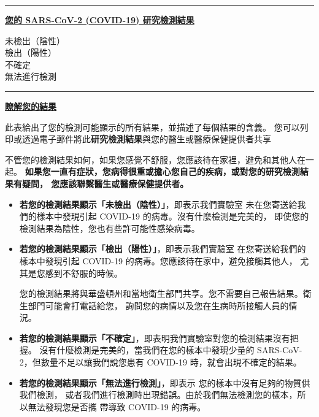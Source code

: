 \documentclass[10pt]{article}
\newcommand{\PageLine}{\rule{\textwidth}{0.25mm}}
\begin{document}
\bigskip
\PageLine

\large \underline{\textbf{您的 SARS-CoV-2 (COVID-19) 研究檢測結果}}

未檢出（陰性）\\
檢出（陽性）\\
不確定\\
無法進行檢測\\

\PageLine
\bigskip

\large \underline{\textbf{瞭解您的結果}}

此表給出了您的檢測可能顯示的所有結果，並描述了每個結果的含義。
您可以列印或透過電子郵件將此\textbf{研究檢測結果}與您的醫生或醫療保健提供者共享

不管您的檢測結果如何，如果您感覺不舒服，您應該待在家裡，避免和其他人在一起。
\textbf{如果您一直有症狀，您病得很重或擔心您自己的疾病，或對您的研究檢測結果有疑問，
您應該聯繫醫生或醫療保健提供者。}

\begin{itemize}


\item

  \textbf{若您的檢測結果顯示「未檢出（陰性）」}，即表示我們實驗室
  未在您寄送給我們的樣本中發現引起 COVID-19 的病毒。沒有什麼檢測是完美的，
  即使您的檢測結果為陰性，您也有些許可能性感染病毒。

\item

  \textbf{若您的檢測結果顯示「檢出（陽性）」}，即表示我們實驗室
  在您寄送給我們的樣本中發現引起 COVID-19 的病毒。您應該待在家中，避免接觸其他人，
  尤其是您感到不舒服的時候。

  您的檢測結果將與華盛頓州和當地衛生部門共享。您不需要自己報告結果。衛生部門可能會打電話給您，
  詢問您的病情以及您在生病時所接觸人員的情況。

\item

  \textbf{若您的檢測結果顯示「不確定」}，即表明我們實驗室對您的檢測結果沒有把握。
  沒有什麼檢測是完美的，當我們在您的樣本中發現少量的 SARS-CoV-2，但數量不足以讓我們說您患有
  COVID-19 時，就會出現不確定的結果。

\item

  \textbf{若您的檢測結果顯示「無法進行檢測」}，即表示 您的樣本中沒有足夠的物質供我們檢測，
  或者我們進行檢測時出現錯誤。由於我們無法檢測您的樣本，所以無法發現您是否攜 帶導致 COVID-19
  的病毒。

\end{itemize}
\end{document}
